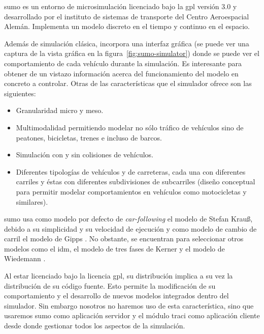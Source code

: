 \gls{sumo} es un entorno de microsimulación licenciado bajo la \gls{gpl} versión $3$.$0$ y desarrollado por el instituto de sistemas de transporte del Centro Aeroespacial Alemán. Implementa un modelo discreto en el tiempo y continuo en el espacio.

Además de simulación clásica, incorpora una interfaz gráfica (se puede ver una captura de la vista gráfica en la figura~\ref{fig:sumo-simulator}) donde se puede ver el comportamiento de cada vehículo durante la simulación. Es interesante para obtener de un vistazo información acerca del funcionamiento del modelo en concreto a controlar. Otras de las características que el simulador ofrece son las siguientes:

\begin{itemize}
	\item Granularidad micro y meso.
	\item Multimodalidad permitiendo modelar no sólo tráfico de vehículos sino de peatones, bicicletas, trenes e incluso de barcos.
	\item Simulación con y sin colisiones de vehículos.
	\item Diferentes tipologías de vehículos y de carreteras, cada una con diferentes carriles y éstas con diferentes subdivisiones de subcarriles (diseño conceptual para permitir modelar comportamientos en vehículos como motocicletas y similares).
\end{itemize}

\gls{sumo} usa como modelo por defecto de \textit{\gls{car-following}} el modelo de Stefan Krauß\cite{jin2016evaluation}, debido a su simplicidad y su velocidad de ejecución y como modelo de cambio de carril el modelo de Gipps \cite{krajzewicz2002sumo}. No obstante, se encuentran para seleccionar otros modelos como el \gls{idm}, el modelo de tres fases de Kerner \cite{kerner2008testbed} y el modelo de Wiedemann \cite{wiedemann1974simulation}.

Al estar licenciado bajo la licencia \gls{gpl}, su distribución implica a su vez la distribución de su código fuente. Esto permite la modificación de su comportamiento y el desarrollo de nuevos modelos integrados dentro del simulador. Sin embargo nosotros no haremos uso de esta característica, sino que usaremos \gls{sumo} como aplicación servidor y el módulo \gls{traci} como aplicación cliente desde donde gestionar todos los aspectos de la simulación.

